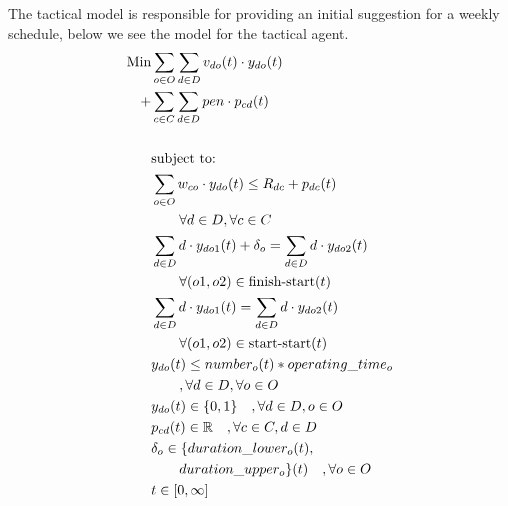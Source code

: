 The tactical model is responsible for providing an initial suggestion for a weekly schedule, below we see the model for the tactical agent.
\begin{alignat}{2}
\text{Min}     & \sum_{o \in O} \sum_{d \in D} v_{do}(t) \cdot y_{do}(t)                                                      \\  
	         + & \sum_{c \in C} \sum_{d \in D} pen \cdot p_{cd}(t)                                               \\  
			                                                                                                  \\
               &\text{subject to:}                                                          \notag                                                                   \\
	           & \sum_{o \in O} w_{co} \cdot y_{do}(t)  \leq R_{dc} + p_{dc}(t)                                   \\ 
			   & \quad \quad \forall  d \in D, \forall c \in C                              \notag                                    \\ 
	           & \sum_{d \in D} d \cdot y_{do1}(t) + \delta_o  = \sum_{d \in D} d \cdot y_{do2}(t)                    \\ 
			   & \quad \quad \forall (o1, o2) \in \text{finish-start}(t)                        \notag                                   \\ 
	           & \sum_{d \in D} d \cdot y_{do1}(t) = \sum_{d \in D} d \cdot y_{do2}(t)                                \\ 
			   & \quad \quad \forall (o1, o2) \in \text{start-start}(t)                          \notag                             \\ 
			   & y_{do}(t) \leq number_o(t) * operating\_time_o                                                     \\ 
			   & \quad \quad ,\forall d \in D, \forall o \in O                              \notag                                    \\
			   & y_{do}(t) \in \{0, 1\} \quad ,\forall d \in D, o \in O                                          \\
			   & p_{cd}(t) \in \mathbb{R} \quad ,\forall c \in C, d \in D                                        \\
			   & \delta_o \in \{ duration\_lower_o(t),                                                           \\ 
			   & \quad \quad duration\_upper_o \}(t) \quad, \forall o \in O \notag                                      \\
			   & t \in  [0, \infty] 
\end{alignat}

